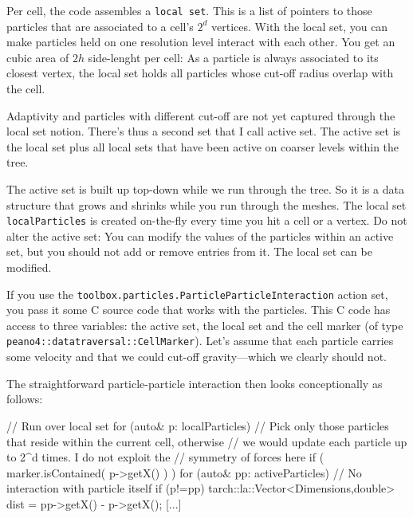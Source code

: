 Per cell, the code assembles a \texttt{local set}. 
This is a list of pointers to those particles that are associated to a cell's
$2^d$ vertices.
With the local set, you can make particles held on one resolution level
interact with each other.
You get an cubic area of $2h$ side-lenght per cell:
As a particle is always associated to its closest vertex, the local set holds all particles whose cut-off radius overlap with the cell. 


Adaptivity and particles with different cut-off are not yet captured through the
local set notion.
There's thus a second set that I call active set. 
The active set is the local set plus all local sets that have been active on
coarser levels within the tree.

\begin{definition}
 The active set is built up top-down while we run through the
 tree.
 So it is a data structure that grows and shrinks while you run through the
 meshes.
 The local set \texttt{localParticles} is created on-the-fly every time you hit
 a cell or a vertex.
 Do not alter the active set: You can modify the values of the particles within
 an active set, but you should not add or remove entries from it.
 The local set can be modified.
\end{definition}


If you use the \texttt{toolbox.particles.ParticleParticleInteraction} action
set, you pass it some C source code that works with the particles.
This C code has access to three variables: the active set, the local set and the
cell marker (of type \linebreak \texttt{peano4::datatraversal::CellMarker}).
Let's assume that each particle carries some velocity and that we could cut-off
gravity---which we clearly should not.


The straightforward particle-particle interaction then looks conceptionally as
follows:

\begin{code}
// Run over local set
for (auto& p: localParticles) {
  // Pick only those particles that reside within the current cell, otherwise
  // we would update each particle up to 2^d times. I do not exploit the
  // symmetry of forces here
  if ( marker.isContained( p->getX() ) ) {
    for (auto& pp: activeParticles) {
      // No interaction with particle itself
      if (p!=pp) {
        tarch::la::Vector<Dimensions,double> dist = pp->getX() - p->getX();
        [...]
      }
    }
  }
}
\end{code}




